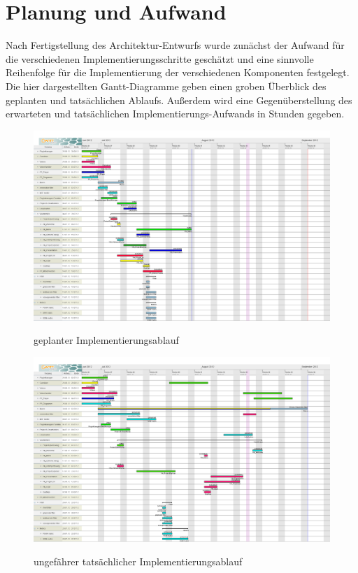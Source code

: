 \chapter{Planung und Aufwand} \label{Planung und Aufwand}

Nach Fertigstellung des Architektur-Entwurfs wurde zunächst der Aufwand für die verschiedenen Implementierungsschritte geschätzt und eine sinnvolle Reihenfolge für die Implementierung der verschiedenen Komponenten festgelegt.
Die hier dargestellten Gantt-Diagramme geben einen groben Überblick des geplanten und tatsächlichen Ablaufs.
Außerdem wird eine Gegenüberstellung des erwarteten und tatsächlichen Implementierungs-Aufwands in Stunden gegeben.


\begin{figure}
\includegraphics[scale=0.25]{bilder/gantt_planung.png}\\[5ex]
\caption{geplanter Implementierungsablauf}
\end{figure}

\begin{figure}
\includegraphics[scale=0.25]{bilder/gantt_tatsaechlich.png}\\[5ex]
\caption{ungefährer tatsächlicher Implementierungsablauf}
\end{figure}


